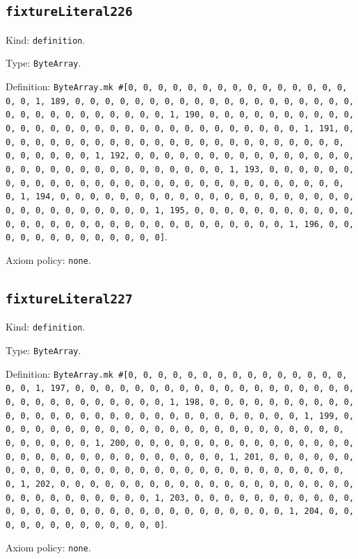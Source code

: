 \documentclass[11pt]{article}
\begin{document}
\subsection*{\texttt{fixtureLiteral226}}
\noindent Kind: \texttt{definition}.\par
\noindent Type: \texttt{ByteArray}.\par
\noindent Definition: \texttt{ByteArray.mk \#[0, 0, 0, 0, 0, 0, 0, 0, 0, 0, 0, 0, 0, 0, 0, 0, 0, 1, 189, 0, 0, 0, 0, 0, 0, 0, 0, 0, 0, 0, 0, 0, 0, 0, 0, 0, 0, 0, 0, 0, 0, 0, 0, 0, 0, 0, 0, 0, 0, 1, 190, 0, 0, 0, 0, 0, 0, 0, 0, 0, 0, 0, 0, 0, 0, 0, 0, 0, 0, 0, 0, 0, 0, 0, 0, 0, 0, 0, 0, 0, 0, 1, 191, 0, 0, 0, 0, 0, 0, 0, 0, 0, 0, 0, 0, 0, 0, 0, 0, 0, 0, 0, 0, 0, 0, 0, 0, 0, 0, 0, 0, 0, 0, 1, 192, 0, 0, 0, 0, 0, 0, 0, 0, 0, 0, 0, 0, 0, 0, 0, 0, 0, 0, 0, 0, 0, 0, 0, 0, 0, 0, 0, 0, 0, 0, 1, 193, 0, 0, 0, 0, 0, 0, 0, 0, 0, 0, 0, 0, 0, 0, 0, 0, 0, 0, 0, 0, 0, 0, 0, 0, 0, 0, 0, 0, 0, 0, 1, 194, 0, 0, 0, 0, 0, 0, 0, 0, 0, 0, 0, 0, 0, 0, 0, 0, 0, 0, 0, 0, 0, 0, 0, 0, 0, 0, 0, 0, 0, 0, 1, 195, 0, 0, 0, 0, 0, 0, 0, 0, 0, 0, 0, 0, 0, 0, 0, 0, 0, 0, 0, 0, 0, 0, 0, 0, 0, 0, 0, 0, 0, 0, 1, 196, 0, 0, 0, 0, 0, 0, 0, 0, 0, 0, 0, 0, 0]}.\par
\noindent Axiom policy: \texttt{none}.\par
\subsection*{\texttt{fixtureLiteral227}}
\noindent Kind: \texttt{definition}.\par
\noindent Type: \texttt{ByteArray}.\par
\noindent Definition: \texttt{ByteArray.mk \#[0, 0, 0, 0, 0, 0, 0, 0, 0, 0, 0, 0, 0, 0, 0, 0, 0, 1, 197, 0, 0, 0, 0, 0, 0, 0, 0, 0, 0, 0, 0, 0, 0, 0, 0, 0, 0, 0, 0, 0, 0, 0, 0, 0, 0, 0, 0, 0, 0, 1, 198, 0, 0, 0, 0, 0, 0, 0, 0, 0, 0, 0, 0, 0, 0, 0, 0, 0, 0, 0, 0, 0, 0, 0, 0, 0, 0, 0, 0, 0, 0, 1, 199, 0, 0, 0, 0, 0, 0, 0, 0, 0, 0, 0, 0, 0, 0, 0, 0, 0, 0, 0, 0, 0, 0, 0, 0, 0, 0, 0, 0, 0, 0, 1, 200, 0, 0, 0, 0, 0, 0, 0, 0, 0, 0, 0, 0, 0, 0, 0, 0, 0, 0, 0, 0, 0, 0, 0, 0, 0, 0, 0, 0, 0, 0, 1, 201, 0, 0, 0, 0, 0, 0, 0, 0, 0, 0, 0, 0, 0, 0, 0, 0, 0, 0, 0, 0, 0, 0, 0, 0, 0, 0, 0, 0, 0, 0, 1, 202, 0, 0, 0, 0, 0, 0, 0, 0, 0, 0, 0, 0, 0, 0, 0, 0, 0, 0, 0, 0, 0, 0, 0, 0, 0, 0, 0, 0, 0, 0, 1, 203, 0, 0, 0, 0, 0, 0, 0, 0, 0, 0, 0, 0, 0, 0, 0, 0, 0, 0, 0, 0, 0, 0, 0, 0, 0, 0, 0, 0, 0, 0, 1, 204, 0, 0, 0, 0, 0, 0, 0, 0, 0, 0, 0, 0, 0]}.\par
\noindent Axiom policy: \texttt{none}.\par
\end{document}
